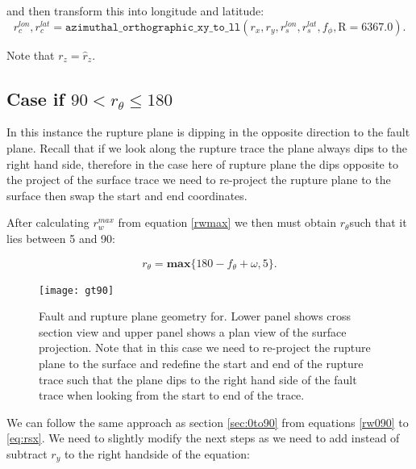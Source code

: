 and then transform this into longitude and latitude:
\begin{equation}\label{eq:rcll}
r_c^{lon}, r_c^{lat} = \mathtt{azimuthal\_orthographic\_xy\_to\_ll}(r_x, r_y,r_s^{lon},r_s^{lat},f_\phi,\mbox{R}=6367.0) .
\end{equation}

Note that $r_z = \hat{r}_z$.

\subsection{Case if $90 <  r_\theta \leq 180$} \label{sec:90t180}

In this instance the rupture plane is dipping in the opposite direction to the fault plane. Recall that if we look along 
the rupture trace the plane always dips to the right hand side, therefore in the case here of rupture plane the dips 
opposite to the project of the surface trace we need to re-project the rupture plane to the surface then swap the 
start and end coordinates. 



After calculating $r_w^{max}$ from equation \ref{rwmax} we then must obtain $r_\theta$such that it lies between 5 and 90:

\begin{equation}
r_\theta = \mathbf{max} \{ 180 - f_\theta + \omega, 5 \} .
\end{equation}



\begin{figure}[htp]
\centerline{\texttt{[image: gt90]}}
\caption{Fault and rupture plane geometry for. Lower panel shows cross section view and upper panel shows a plan view of the surface 
projection. Note that in this case we need to re-project the rupture plane to the surface and redefine the start and end of the 
rupture trace such that the plane dips to the right hand side of the fault trace when looking from the start to end of the trace.}
\label{fig:gt90}
\end{figure}


We can follow the same approach as section \ref{sec:0to90} from equations \ref{rw090} to \ref{eq:rsx}. We need to slightly 
modify the next steps as we need to add instead of subtract $r_y$ to the right handside of the equation: 

